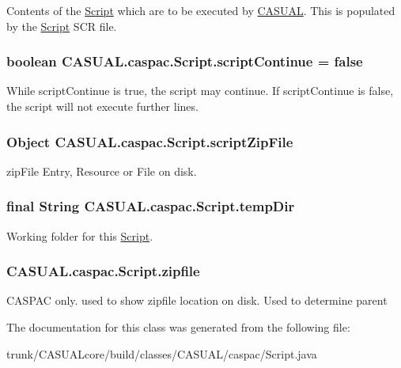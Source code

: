 Contents of the \hyperlink{class_c_a_s_u_a_l_1_1caspac_1_1_script}{Script} which are to be executed by \hyperlink{namespace_c_a_s_u_a_l}{C\-A\-S\-U\-A\-L}. This is populated by the \hyperlink{class_c_a_s_u_a_l_1_1caspac_1_1_script}{Script} S\-C\-R file. \hypertarget{class_c_a_s_u_a_l_1_1caspac_1_1_script_a53be0b1b8c3afd7cc520558edb8d999a}{
\subsubsection[{script\-Continue}]{\setlength{\rightskip}{0pt plus 5cm}boolean C\-A\-S\-U\-A\-L.\-caspac.\-Script.\-script\-Continue = false}}\label{class_c_a_s_u_a_l_1_1caspac_1_1_script_a53be0b1b8c3afd7cc520558edb8d999a}
While script\-Continue is true, the script may continue. If script\-Continue is false, the script will not execute further lines. \hypertarget{class_c_a_s_u_a_l_1_1caspac_1_1_script_a9e7e9a549d9e156aa74f0e574f7c03e1}{
\subsubsection[{script\-Zip\-File}]{\setlength{\rightskip}{0pt plus 5cm}Object C\-A\-S\-U\-A\-L.\-caspac.\-Script.\-script\-Zip\-File}}\label{class_c_a_s_u_a_l_1_1caspac_1_1_script_a9e7e9a549d9e156aa74f0e574f7c03e1}
zip\-File Entry, Resource or File on disk. \hypertarget{class_c_a_s_u_a_l_1_1caspac_1_1_script_add96e553bd0b9511f74ac7e41cba4536}{
\subsubsection[{temp\-Dir}]{\setlength{\rightskip}{0pt plus 5cm}final String C\-A\-S\-U\-A\-L.\-caspac.\-Script.\-temp\-Dir}}\label{class_c_a_s_u_a_l_1_1caspac_1_1_script_add96e553bd0b9511f74ac7e41cba4536}
Working folder for this \hyperlink{class_c_a_s_u_a_l_1_1caspac_1_1_script}{Script}. \hypertarget{class_c_a_s_u_a_l_1_1caspac_1_1_script_a98e22d83bfc5c8d4dd4d7f2a62b433d3}{
\subsubsection[{zipfile}]{ C\-A\-S\-U\-A\-L.\-caspac.\-Script.\-zipfile}}\label{class_c_a_s_u_a_l_1_1caspac_1_1_script_a98e22d83bfc5c8d4dd4d7f2a62b433d3}
C\-A\-S\-P\-A\-C only. used to show zipfile location on disk. Used to determine parent 

The documentation for this class was generated from the following file\-:\begin{DoxyCompactItemize}
\item 
trunk/\-C\-A\-S\-U\-A\-Lcore/build/classes/\-C\-A\-S\-U\-A\-L/caspac/Script.\-java\end{DoxyCompactItemize}
